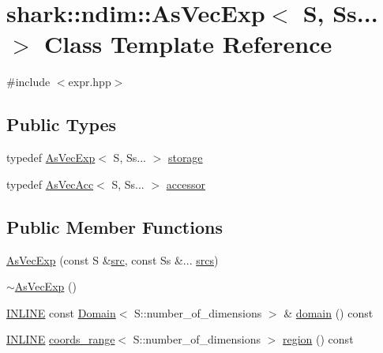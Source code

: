 \hypertarget{classshark_1_1ndim_1_1_as_vec_exp_3_01_s_00_01_ss_8_8_8_01_4}{}\section{shark\+:\+:ndim\+:\+:As\+Vec\+Exp$<$ S, Ss... $>$ Class Template Reference}
\label{classshark_1_1ndim_1_1_as_vec_exp_3_01_s_00_01_ss_8_8_8_01_4}


{\ttfamily \#include $<$expr.\+hpp$>$}

\subsection*{Public Types}
\begin{DoxyCompactItemize}
\item 
typedef \hyperlink{classshark_1_1ndim_1_1_as_vec_exp}{As\+Vec\+Exp}$<$ S, Ss... $>$ \hyperlink{classshark_1_1ndim_1_1_as_vec_exp_3_01_s_00_01_ss_8_8_8_01_4_a8c5a4772eb60d44a64f47d14a1f6d17a}{storage}
\item 
typedef \hyperlink{classshark_1_1ndim_1_1_as_vec_acc}{As\+Vec\+Acc}$<$ S, Ss... $>$ \hyperlink{classshark_1_1ndim_1_1_as_vec_exp_3_01_s_00_01_ss_8_8_8_01_4_a60c74eff0990f421ce075603e7ed320f}{accessor}
\end{DoxyCompactItemize}
\subsection*{Public Member Functions}
\begin{DoxyCompactItemize}
\item 
\hyperlink{classshark_1_1ndim_1_1_as_vec_exp_3_01_s_00_01_ss_8_8_8_01_4_a80abc377b58a39d01b8567ff281ac77f}{As\+Vec\+Exp} (const S \&\hyperlink{classshark_1_1ndim_1_1_as_vec_exp_3_01_s_00_01_ss_8_8_8_01_4_a194abf424b594c3e86a42aa114700e51}{src}, const Ss \&... \hyperlink{classshark_1_1ndim_1_1_as_vec_exp_3_01_s_00_01_ss_8_8_8_01_4_aed5717d0b843d3fbe4c99a13109fbb6b}{srcs})
\item 
\hyperlink{classshark_1_1ndim_1_1_as_vec_exp_3_01_s_00_01_ss_8_8_8_01_4_a5f331adebca4ac26cd57deb7a90590fe}{$\sim$\+As\+Vec\+Exp} ()
\item 
\hyperlink{common_8hpp_a2eb6f9e0395b47b8d5e3eeae4fe0c116}{I\+N\+L\+I\+NE} const \hyperlink{classshark_1_1ndim_1_1_domain}{Domain}$<$ S\+::number\+\_\+of\+\_\+dimensions $>$ \& \hyperlink{classshark_1_1ndim_1_1_as_vec_exp_3_01_s_00_01_ss_8_8_8_01_4_a966cfc78765aacd255d04561c5113955}{domain} () const
\item 
\hyperlink{common_8hpp_a2eb6f9e0395b47b8d5e3eeae4fe0c116}{I\+N\+L\+I\+NE} \hyperlink{structshark_1_1ndim_1_1coords__range}{coords\+\_\+range}$<$ S\+::number\+\_\+of\+\_\+dimensions $>$ \hyperlink{classshark_1_1ndim_1_1_as_vec_exp_3_01_s_00_01_ss_8_8_8_01_4_a885d0c0a2d813c3aa2685dc68be585a2}{region} () const
\end{DoxyCompactItemize}

